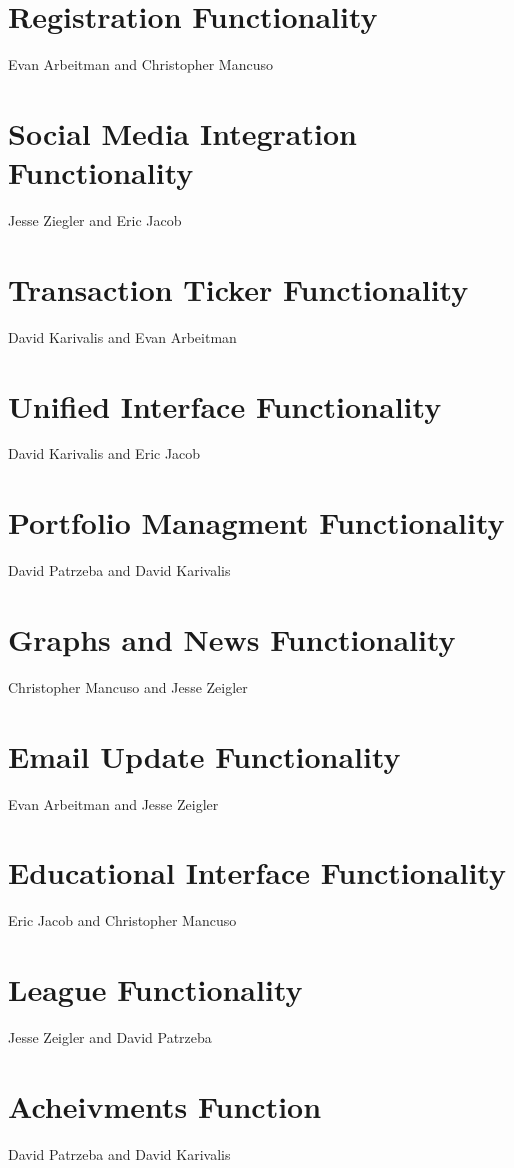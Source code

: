 \documentclass[11pt,letterpaper,oneside]{memoir}
\begin{document}
\section{Registration Functionality}

Evan Arbeitman and Christopher Mancuso

\section{Social Media Integration Functionality}

Jesse Ziegler and Eric Jacob

\section{Transaction Ticker Functionality}

David Karivalis and Evan Arbeitman

\section{Unified Interface Functionality}

David Karivalis and Eric Jacob

\section{Portfolio Managment Functionality}

David Patrzeba and David Karivalis

\section{Graphs and News Functionality}

Christopher Mancuso and Jesse Zeigler

\section{Email Update Functionality}

Evan Arbeitman and Jesse Zeigler

\section{Educational Interface Functionality}

Eric Jacob and Christopher Mancuso

\section{League Functionality}

Jesse Zeigler and David Patrzeba

\section{Acheivments Function}

David Patrzeba and David Karivalis
\end{document}
